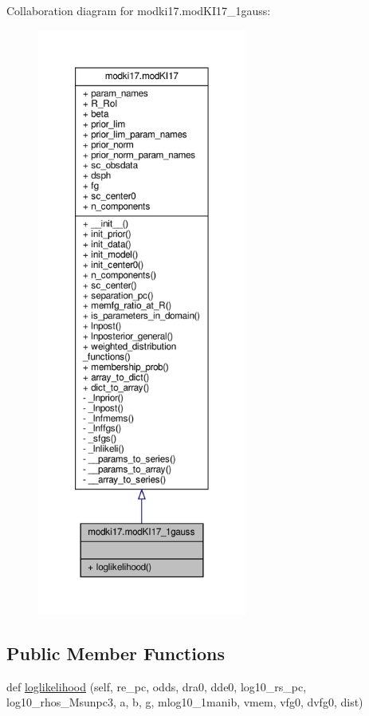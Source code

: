 Collaboration diagram for modki17.\+mod\+K\+I17\+\_\+1gauss\+:\nopagebreak
\begin{figure}[H]
\begin{center}
\leavevmode
\includegraphics[height=550pt]{d4/d3c/classmodki17_1_1modKI17__1gauss__coll__graph}
\end{center}
\end{figure}
\subsection*{Public Member Functions}
\begin{DoxyCompactItemize}
\item 
def \hyperlink{classmodki17_1_1modKI17__1gauss_a33a9f117f11c57c90b8d95661ce9980b}{loglikelihood} (self, re\+\_\+pc, odds, dra0, dde0, log10\+\_\+rs\+\_\+pc, log10\+\_\+rhos\+\_\+\+Msunpc3, a, b, g, mlog10\+\_\+1manib, vmem, vfg0, dvfg0, dist)
\end{DoxyCompactItemize}
